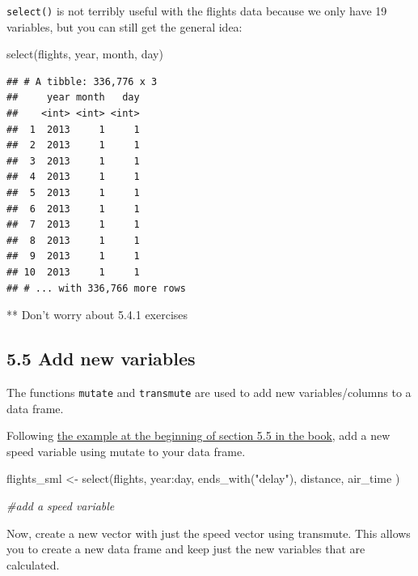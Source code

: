 \documentclass[
]{article}
\newenvironment{Shaded}{\begin{snugshade}}{\end{snugshade}}
\newcommand{\CommentTok}[1]{\textcolor[rgb]{0.56,0.35,0.01}{\textit{#1}}}
\newcommand{\FunctionTok}[1]{\textcolor[rgb]{0.00,0.00,0.00}{#1}}
\newcommand{\NormalTok}[1]{#1}
\newcommand{\OtherTok}[1]{\textcolor[rgb]{0.56,0.35,0.01}{#1}}
\newcommand{\SpecialCharTok}[1]{\textcolor[rgb]{0.00,0.00,0.00}{#1}}
\newcommand{\StringTok}[1]{\textcolor[rgb]{0.31,0.60,0.02}{#1}}
\begin{document}
\texttt{select()} is not terribly useful with the flights data because
we only have 19 variables, but you can still get the general idea:

\begin{Shaded}
\begin{Highlighting}[]
\FunctionTok{select}\NormalTok{(flights, year, month, day)}
\end{Highlighting}
\end{Shaded}

\begin{verbatim}
## # A tibble: 336,776 x 3
##     year month   day
##    <int> <int> <int>
##  1  2013     1     1
##  2  2013     1     1
##  3  2013     1     1
##  4  2013     1     1
##  5  2013     1     1
##  6  2013     1     1
##  7  2013     1     1
##  8  2013     1     1
##  9  2013     1     1
## 10  2013     1     1
## # ... with 336,766 more rows
\end{verbatim}

** Don't worry about 5.4.1 exercises

\hypertarget{add-new-variables}{%
\subsection{5.5 Add new variables}\label{add-new-variables}}

The functions \texttt{mutate} and \texttt{transmute} are used to add new
variables/columns to a data frame.

Following
\href{https://r4ds.had.co.nz/transform.html\#add-new-variables-with-mutate}{the
example at the beginning of section 5.5 in the book}, add a new speed
variable using mutate to your data frame.

\begin{Shaded}
\begin{Highlighting}[]
\NormalTok{flights\_sml }\OtherTok{\textless{}{-}} \FunctionTok{select}\NormalTok{(flights, }
\NormalTok{  year}\SpecialCharTok{:}\NormalTok{day, }
  \FunctionTok{ends\_with}\NormalTok{(}\StringTok{"delay"}\NormalTok{), }
\NormalTok{  distance, }
\NormalTok{  air\_time}
\NormalTok{)}

\CommentTok{\#add a speed variable}
\end{Highlighting}
\end{Shaded}

Now, create a new vector with just the speed vector using transmute.
This allows you to create a new data frame and keep just the new
variables that are calculated.
\end{document}
